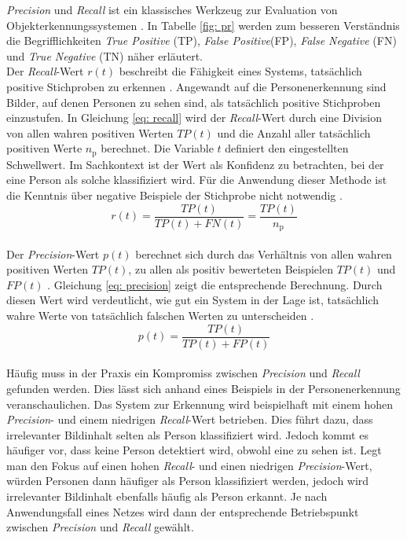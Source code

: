		
		
		\textit{Precision} und \textit{Recall} ist ein klassisches Werkzeug zur Evaluation von Objekterkennungssystemen \cite{precisionandrecall}. In Tabelle \ref{fig: pr} werden zum besseren Verständnis die Begrifflichkeiten \textit{True Positive} (TP), \textit{False Positive}(FP), \textit{False Negative} (FN) und \textit{True Negative} (TN) näher erläutert.\\
		
		Der \textit{Recall}-Wert $r(t)$ beschreibt die Fähigkeit eines Systems, tatsächlich positive Stichproben zu erkennen \cite{precisionandrecall}. Angewandt auf die Personenerkennung sind Bilder, auf denen Personen zu sehen sind, als tatsächlich positive Stichproben einzustufen. In Gleichung \ref{eq: recall} wird der \textit{Recall}-Wert durch eine Division von allen wahren positiven Werten $TP(t)$ und die Anzahl aller tatsächlich positiven Werte $n_\text{p}$ berechnet. Die Variable $t$ definiert den eingestellten Schwellwert. Im Sachkontext ist der Wert als Konfidenz zu betrachten, bei der eine Person als solche klassifiziert wird. Für die Anwendung dieser Methode ist die Kenntnis über negative Beispiele der Stichprobe nicht notwendig \cite{bildundobjekt}.\\ 
		
		\begin{equation}
		r(t)=\frac{TP(t)}{TP(t)+FN(t)}=\frac{TP(t)}{n_\text{p}}
		\label{eq: recall}
		\end{equation}\\
		
		Der \textit{Precision}-Wert $p(t)$ berechnet sich durch das Verhältnis von allen wahren positiven Werten $TP(t)$, zu allen als positiv bewerteten Beispielen $TP(t)$ und $FP(t)$ \cite{precisionandrecall}. Gleichung \ref{eq: precision} zeigt die entsprechende Berechnung. Durch diesen Wert wird verdeutlicht, wie gut ein System in der Lage ist, tatsächlich wahre Werte von tatsächlich falschen Werten zu unterscheiden \cite{precisionandrecall}.\\
		
		\begin{equation}
		p(t)=\frac{TP(t)}{TP(t)+FP(t)}
		\label{eq: precision}
		\end{equation}\\
		
		Häufig muss in der Praxis ein Kompromiss zwischen \textit{Precision} und \textit{Recall} gefunden werden. Dies lässt sich anhand eines Beispiels in der Personenerkennung veranschaulichen. Das System zur Erkennung wird beispielhaft mit einem hohen \textit{Precision}- und einem niedrigen \textit{Recall}-Wert betrieben. Dies führt dazu, dass irrelevanter Bildinhalt selten als Person klassifiziert wird. Jedoch kommt es häufiger vor, dass keine Person detektiert wird, obwohl eine zu sehen ist. Legt man den Fokus auf einen hohen \textit{Recall}- und einen niedrigen \textit{Precision}-Wert, würden Personen dann häufiger als Person klassifiziert werden, jedoch wird irrelevanter Bildinhalt ebenfalls häufig als Person erkannt. Je nach Anwendungsfall eines Netzes wird dann der entsprechende Betriebspunkt zwischen \textit{Precision} und \textit{Recall} gewählt.\\	
	
